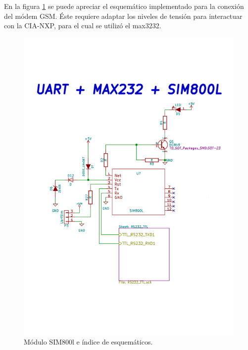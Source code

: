 En la figura \ref{fig:essim800} se puede apreciar el esquemático implementado para la conexión del módem GSM. Éste requiere adaptar los niveles de tensión para interactuar con la CIA-NXP, para el cual se utilizó el max3232.
\begin{figure}[!hp]
  \centering
  \includegraphics[page=1,scale=0.5,clip,trim=1cm 4.7cm 1.2cm 2.5cm]{./Figures/sch_modem_sim800.pdf}
  \caption{Módulo SIM800l e índice de esquemáticos.}
  \label{fig:essim800}
\end{figure}

